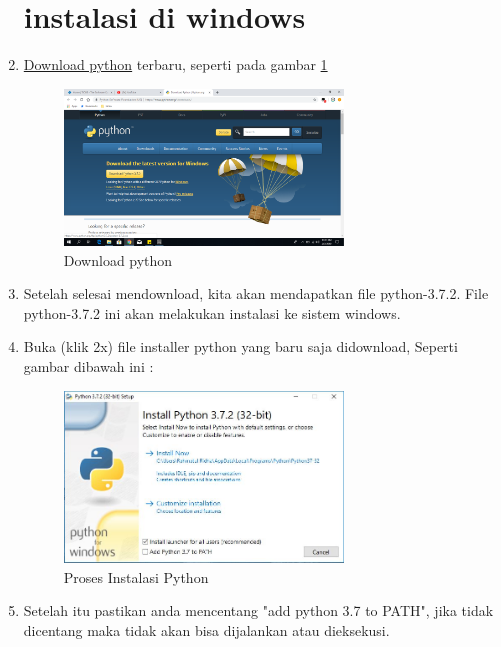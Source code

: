 \begin{enumerate}
	
\section{instalasi di windows}
	
\item   \href{https://www.python.org/downloads/}{Download python} terbaru, seperti pada gambar \ref{Download}
\begin{figure}[ht]
	\centerline{\includegraphics[width=0.70\textwidth]{figures/download_python.PNG}}
	\caption{Download python}
	\label{Download}
\end{figure}
	
\item	Setelah selesai mendownload, kita akan mendapatkan file python-3.7.2. File python-3.7.2 ini akan melakukan instalasi ke sistem windows.
\item   Buka (klik 2x) file installer python yang baru saja didownload, Seperti gambar dibawah ini :
\begin{figure}[ht]
	\centerline{\includegraphics[width=0.70\textwidth]{figures/InstalasiPython.JPG}}
	\caption{Proses Instalasi Python}
	\label{Instalasi}
\end{figure} 
   
\item   Setelah itu pastikan anda mencentang "add python 3.7 to PATH", jika tidak dicentang maka tidak akan bisa dijalankan atau dieksekusi.
	

\end{enumerate}
